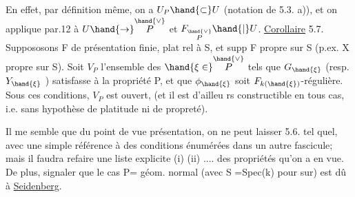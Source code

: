 En effet, par définition même, on a $U_P \hand{\subset} U$ (notation de 5.3. a)),
et on applique par.12 à $U \hand{\to} \overset{\hand{\vee}}{P}$ et $F_{\overset{\hand{\vee}}{P}}\hand{|}U$.
\uline{Corollaire} 5.7. Suppososons F de présentation finie, plat rel à S,
et supp F propre sur S (p.ex. X propre sur S). Soit $V_P$ l'ensemble des
$\hand{\xi\in}\overset{\hand{\vee}}{P}$ tels que $G_{\hand{\xi}}$ (resp. $Y_{\hand{\xi}}$ ) satisfasse à la propriété P, et que $\phi_{\hand{\xi}}$ soit
$F_{k(\hand{\xi})}$-régulière. Sous ces conditions, $V_P$ est ouvert, (et il est d'ailleu
rs constructible en tous cas, i.e. sans hypothèse de platitude ni de
propreté).

Il me semble que du point de vue présentation, on ne peut laisser
5.6. tel quel, avec une simple référence à des conditions énumérées dans
un autre fascicule; mais il faudra refaire une liste explicite (i) (ii)
.... des propriétés qu'on a en vue. De plus, signaler  que le cas P= géom.
normal (avec S =Spec(k) pour sur) est dû à \uline{Seidenberg}.


